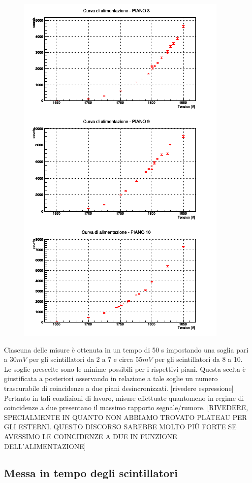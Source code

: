 \documentclass[11pt]{article}
\begin{document}
\begin{figure}
\includegraphics{"plateau_altri"}
\end{figure}

Ciascuna delle misure è ottenuta in un tempo di 50 s impostando una soglia pari a $30 mV$ per gli scintillatori da 2 a 7 e circa $55 mV$ per gli scintillatori da 8 a 10. Le soglie prescelte sono le minime possibili per i rispettivi piani. Questa scelta è giustificata a posteriori osservando in relazione a tale soglie un numero trascurabile di coincidenze a due piani desincronizzati. [rivedere espressione] Pertanto in tali condizioni di lavoro, misure effettuate quantomeno in regime di coincidenze a due presentano il massimo rapporto segnale/rumore. [RIVEDERE, SPECIALMENTE IN QUANTO NON ABBIAMO TROVATO PLATEAU PER GLI ESTERNI. QUESTO DISCORSO SAREBBE MOLTO PIÙ FORTE SE AVESSIMO LE COINCIDENZE A DUE IN FUNZIONE DELL'ALIMENTAZIONE]

\subsection{Messa in tempo degli scintillatori}
\end{document}
